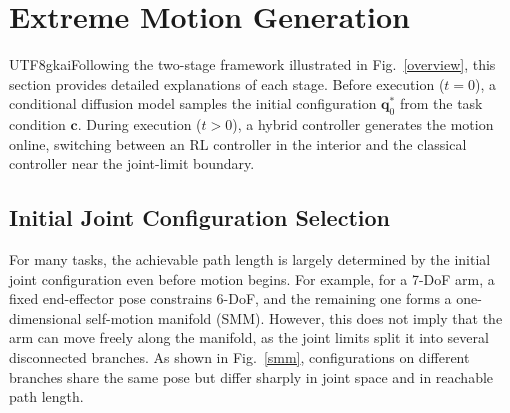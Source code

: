 \documentclass{svproc}
\newcommand{\xinyi}[1]{{\color{darkorange}\begin{CJK*}{UTF8}{gkai}#1\end{CJK*}}}
\begin{document}
\section{Extreme Motion Generation}
\xinyi{Following the two-stage framework illustrated in Fig.~\ref{overview}, this section provides detailed explanations of each stage. Before execution ($t=0$), a conditional diffusion model samples the initial configuration $\mathbf{q}_{0}^{*}$ from the task condition $\mathbf{c}$. During execution ($t>0$), a hybrid controller generates the motion online, switching between an RL controller in the interior and the classical controller near the joint-limit boundary.}




\subsection{Initial Joint Configuration Selection}

For many tasks, the achievable path length is largely determined by the initial joint configuration even before motion begins. For example, for a 7-DoF arm, a fixed end-effector pose constrains 6-DoF, and the remaining one forms a one-dimensional self-motion manifold (SMM). However, this does not imply that the arm can move freely along the manifold, as the joint limits split it into several disconnected branches. As shown in Fig.~\ref{smm}, configurations on different branches share the same pose but differ sharply in joint space and in reachable path length.
\end{document}
